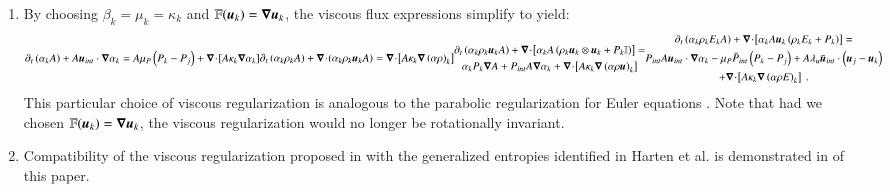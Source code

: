 \documentclass[preprint,10pt]{elsarticle}
\begin{document}
\begin{enumerate}
\item { By choosing $\beta_k = \mu_k = \kappa_k$ and $\mathbb{F}(\boldsymbol u_k) = \boldsymbol\nabla \boldsymbol u_k$, the viscous flux expressions simplify to yield: 
\begin{subequations}\label{eq:sev_equ-parab}
\begin{align}\label{eq:sev_equ-parab-vf}
\partial_t \left( \alpha_k  A\right) + A \mbold u_{int} \cdot \grad \alpha_k = A \mu_P \left( P_k - P_j \right) + \div \left[ A \kappa_k \grad \alpha_k \right]
\end{align}
\begin{align}\label{eq:sev_equ-parab-cont}
\partial_t \left( \alpha_k \rho_k A \right) + \div \left( \alpha_k \rho_k \mbold u_k A \right) = \div \left[ A \kappa_k \grad \left( \alpha \rho \right)_k \right]
\end{align}
\begin{multline}\label{eq:sev_equ-parab-mom}
\partial_t \left( \alpha_k \rho_k \mbold u_k A \right) + \div \left[ \alpha_k A \left( \rho_k \mbold u_k \otimes \mbold u_k + P_k \mathbb{I} \right) \right] = \\
\alpha_k P_k \grad A + P_{int} A \grad \alpha_k + \div \left[ A \kappa_k \grad \left( \alpha \rho \mbold u  \right)_k \right] 
\end{multline}
\begin{multline}\label{eq:sev_equ-parab-ener}
\partial_t \left( \alpha_k \rho_k E_k A \right) + \div \left[ \alpha_k A \mbold u_k \left( \rho_k E_k + P_k \right) \right] = \\
P_{int} A \mbold u_{int} \cdot \grad \alpha_k -
\mu_P \bar{P}_{int} \left( P_k-P_j \right) + 
A \lambda_u \bar{\mbold u}_{int} \cdot \left( \mbold u_j - \mbold u_k \right)  \\
+ \div \left[A \kappa_k \grad \left( \alpha \rho E \right)_k \right] \ .
\end{multline} 
\end{subequations}
This particular choice of viscous regularization is analogous to the parabolic regularization for Euler equations \cite{Parabolic}. 
Note that had we chosen $\mathbb{F}(\boldsymbol u_k) = \boldsymbol\nabla \boldsymbol u_k$, the viscous regularization would no longer be rotationally invariant.
}
    
\item{Compatibility of the viscous regularization proposed in  with the generalized entropies identified 
in Harten et al. \cite{Harten} is demonstrated in  of this paper. } 
\end{enumerate}
\end{document}
